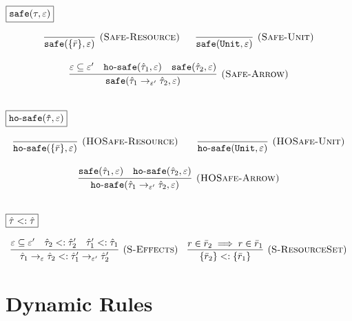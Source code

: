 \documentclass{llncs}
\newcommand{\keywadj}[1]{\mathtt{#1}}
\newcommand{\kwa}[1]{\keywadj{ #1 }}
\newcommand{\hyphen}{\hbox{-}}
\begin{document}
\noindent
$\fbox{$\kwa{safe(\tau, \varepsilon)}$}$

\[
\begin{array}{c}

\infer[\textsc{(Safe-Resource)}]
	{\kwa{safe}(\{ \bar r \}, \varepsilon)}
	{}
~~~~~
\infer[\textsc{(Safe-Unit)}]
	{\kwa{safe}(\kwa{Unit}, \varepsilon)}
	{} \\[3ex]

\infer[\textsc{(Safe-Arrow)}]
	{\kwa{safe}(\hat \tau_1 \rightarrow_{\varepsilon'} \hat \tau_2, \varepsilon)}
	{\varepsilon \subseteq \varepsilon' & \kwa{ho \hyphen safe}(\hat \tau_1, \varepsilon) & \kwa{safe}(\hat \tau_2, \varepsilon)} \\[3ex]

\end{array}
\]

\noindent
$\fbox{$\kwa{ho \hyphen safe(\hat \tau, \varepsilon)}$}$

\[
\begin{array}{c}

\infer[\textsc{(HOSafe-Resource)}]
	{ \kwa{ho \hyphen safe}( \{ \bar r \}, \varepsilon)} 
	{}
	~~~~~~
\infer[\textsc{(HOSafe-Unit)}]
	{ \kwa{ho \hyphen safe}( \kwa{Unit}, \varepsilon)} 
	{}\\[3ex]

\infer[\textsc{(HOSafe-Arrow)}]
	{ \kwa{ho \hyphen safe}( \hat \tau_1 \rightarrow_{\varepsilon'} \hat \tau_2, \varepsilon ) }
	{ \kwa{safe}(\hat \tau_1, \varepsilon)  & \kwa{ho \hyphen safe}(\hat \tau_2, \varepsilon) }\\[3ex]

\end{array}
\]

\noindent
$\fbox{$\hat \tau <: \hat \tau$}$

\[
\begin{array}{c}

\infer[(\textsc{S-Effects})]
	{\hat \tau_1 \rightarrow_{\varepsilon} \hat \tau_2 <: \hat \tau_1' \rightarrow_{\varepsilon'} \hat \tau_2'}
	{\varepsilon \subseteq \varepsilon' & \hat \tau_2 <: \hat \tau_2' & \hat \tau_1' <: \hat \tau_1}
~~~
\infer[(\textsc{S-ResourceSet})]
	{\{ \bar r_2 \} <: \{ \bar r_1 \}}
	{r \in \bar r_2 \implies r \in \bar r_1}


\end{array}
\]

\section{Dynamic Rules}
\end{document}
